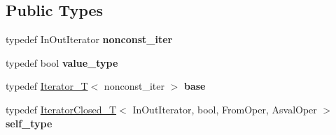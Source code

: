 \subsection*{Public Types}
\begin{DoxyCompactItemize}
\item 
typedef In\+Out\+Iterator {\bfseries nonconst\+\_\+iter}\hypertarget{classswig_1_1IteratorClosed__T_3_01InOutIterator_00_01bool_00_01FromOper_00_01AsvalOper_01_4_acb63ffc6d07709c2023a4951d27a0924}{}\label{classswig_1_1IteratorClosed__T_3_01InOutIterator_00_01bool_00_01FromOper_00_01AsvalOper_01_4_acb63ffc6d07709c2023a4951d27a0924}

\item 
typedef bool {\bfseries value\+\_\+type}\hypertarget{classswig_1_1IteratorClosed__T_3_01InOutIterator_00_01bool_00_01FromOper_00_01AsvalOper_01_4_a220ac434a52e513f9fe1ec1f363d7554}{}\label{classswig_1_1IteratorClosed__T_3_01InOutIterator_00_01bool_00_01FromOper_00_01AsvalOper_01_4_a220ac434a52e513f9fe1ec1f363d7554}

\item 
typedef \hyperlink{classswig_1_1Iterator__T}{Iterator\+\_\+T}$<$ nonconst\+\_\+iter $>$ {\bfseries base}\hypertarget{classswig_1_1IteratorClosed__T_3_01InOutIterator_00_01bool_00_01FromOper_00_01AsvalOper_01_4_a37d811e3b00f549d07e3f128fbbe52b0}{}\label{classswig_1_1IteratorClosed__T_3_01InOutIterator_00_01bool_00_01FromOper_00_01AsvalOper_01_4_a37d811e3b00f549d07e3f128fbbe52b0}

\item 
typedef \hyperlink{classswig_1_1IteratorClosed__T}{Iterator\+Closed\+\_\+T}$<$ In\+Out\+Iterator, bool, From\+Oper, Asval\+Oper $>$ {\bfseries self\+\_\+type}\hypertarget{classswig_1_1IteratorClosed__T_3_01InOutIterator_00_01bool_00_01FromOper_00_01AsvalOper_01_4_a2b58ba942e0ccbd3419f7a3f909fa17b}{}\label{classswig_1_1IteratorClosed__T_3_01InOutIterator_00_01bool_00_01FromOper_00_01AsvalOper_01_4_a2b58ba942e0ccbd3419f7a3f909fa17b}

\end{DoxyCompactItemize}
